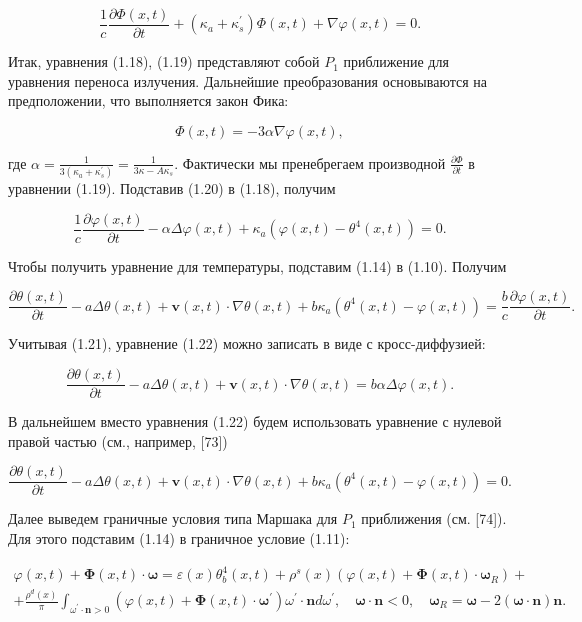 \documentclass[10pt]{article}
\begin{document}
$$
\frac{1}{c} \frac{\partial \Phi(x, t)}{\partial t}+\left(\kappa_{a}+\kappa_{s}^{\prime}\right) \Phi(x, t)+\nabla \varphi(x, t)=0 .
$$

Итак, уравнения (1.18), (1.19) представляют собой $P_{1}$ приближение для уравнения переноса излучения. Дальнейшие преобразования основываются на предположении, что выполняется закон Фика:

$$
\Phi(x, t)=-3 \alpha \nabla \varphi(x, t),
$$

где $\alpha=\frac{1}{3\left(\kappa_{a}+\kappa_{s}^{\prime}\right)}=\frac{1}{3 \kappa-A \kappa_{s}}$. Фактически мы пренебрегаем производной $\frac{\partial \Phi}{\partial t}$ в уравнении (1.19). Подставив (1.20) в (1.18), получим

$$
\frac{1}{c} \frac{\partial \varphi(x, t)}{\partial t}-\alpha \Delta \varphi(x, t)+\kappa_{a}\left(\varphi(x, t)-\theta^{4}(x, t)\right)=0 .
$$

Чтобы получить уравнение для температуры, подставим (1.14) в (1.10). Получим

$$
\frac{\partial \theta(x, t)}{\partial t}-a \Delta \theta(x, t)+\mathbf{v}(x, t) \cdot \nabla \theta(x, t)+b \kappa_{a}\left(\theta^{4}(x, t)-\varphi(x, t)\right)=\frac{b}{c} \frac{\partial \varphi(x, t)}{\partial t} .
$$

Учитывая (1.21), уравнение (1.22) можно записать в виде с кросс-диффузией:

$$
\frac{\partial \theta(x, t)}{\partial t}-a \Delta \theta(x, t)+\mathbf{v}(x, t) \cdot \nabla \theta(x, t)=b \alpha \Delta \varphi(x, t) .
$$

В дальнейшем вместо уравнения (1.22) будем использовать уравнение с нулевой правой частью (см., например, [73])

$$
\frac{\partial \theta(x, t)}{\partial t}-a \Delta \theta(x, t)+\mathbf{v}(x, t) \cdot \nabla \theta(x, t)+b \kappa_{a}\left(\theta^{4}(x, t)-\varphi(x, t)\right)=0 .
$$

Далее выведем граничные условия типа Маршака для $P_{1}$ приближения (см. [74]). Для этого подставим (1.14) в граничное условие (1.11):

$$
\begin{gathered}
\varphi(x, t)+\boldsymbol{\Phi}(x, t) \cdot \boldsymbol{\omega}=\varepsilon(x) \theta_{b}^{4}(x, t)+\rho^{s}(x)\left(\varphi(x, t)+\boldsymbol{\Phi}(x, t) \cdot \boldsymbol{\omega}_{R}\right)+ \\
+\frac{\rho^{d}(x)}{\pi} \int_{\omega^{\prime} \cdot \mathbf{n}>0}\left(\varphi(x, t)+\boldsymbol{\Phi}(x, t) \cdot \boldsymbol{\omega}^{\prime}\right) \omega^{\prime} \cdot \mathbf{n} d \omega^{\prime}, \quad \boldsymbol{\omega} \cdot \mathbf{n}<0, \quad \boldsymbol{\omega}_{R}=\boldsymbol{\omega}-2(\boldsymbol{\omega} \cdot \mathbf{n}) \mathbf{n} .
\end{gathered}
$$
\end{document}
